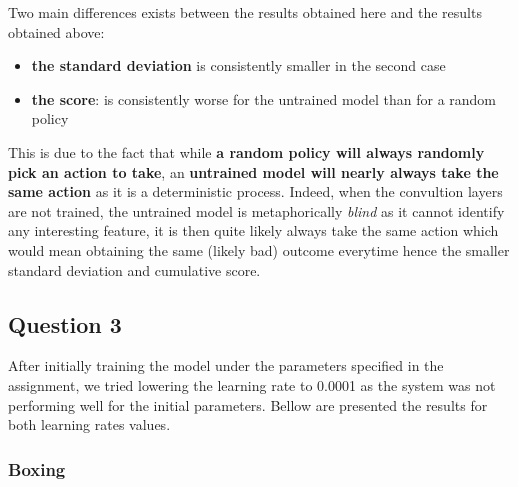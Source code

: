\documentclass{report}
\begin{document}
Two main differences exists between the results obtained here and the results obtained above:
\begin{itemize}
	\item \textbf{the standard deviation}  is consistently smaller in the second case
	\item \textbf{the score}: is consistently worse for the untrained model than for a random policy
\end{itemize}

This is due to the fact that while \textbf{a random policy will always randomly pick an action to take}, an \textbf{untrained model will nearly always take the same action} as it is a deterministic process. Indeed, when the convultion layers are not trained, the untrained model is metaphorically \textit{blind} as it cannot identify any interesting feature, it is then quite likely always take the same action which would mean obtaining the same (likely bad) outcome everytime hence the smaller standard deviation and cumulative score.

\subsection*{Question 3}

After initially training the model under the parameters specified in the assignment, we tried lowering the learning rate to 0.0001 as the system was not performing well for the initial parameters. Bellow are presented the results for both learning rates values. 

\subsubsection*{Boxing}
\end{document}
